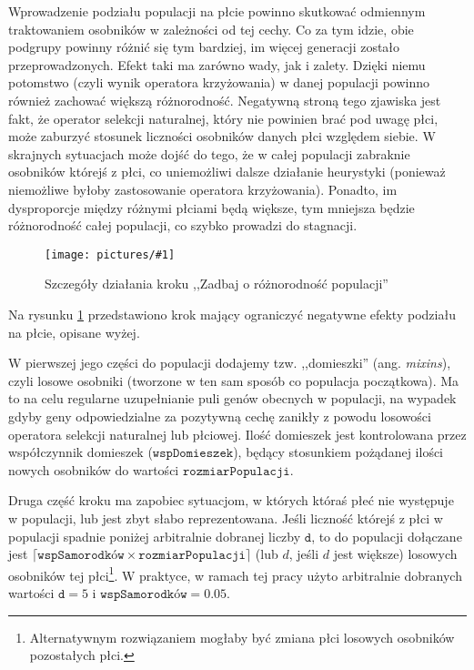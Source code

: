 \documentclass[twoside]{iisthesis}
\newcommand{\param}[1]{\mathtt{#1}}
\newcommand{\img}[1]{\texttt{[image: pictures/\#1]}}
\begin{document}
Wprowadzenie podziału populacji na płcie powinno skutkować odmiennym traktowaniem osobników w zależności od tej cechy. 
Co za tym idzie, obie podgrupy powinny różnić się tym bardziej, im więcej generacji zostało przeprowadzonych.
Efekt taki ma zarówno wady, jak i zalety. 
Dzięki niemu potomstwo (czyli wynik operatora krzyżowania) w danej populacji powinno również zachować większą różnorodność. 
Negatywną stroną tego zjawiska jest fakt, że operator selekcji naturalnej, który nie powinien brać pod uwagę płci, może zaburzyć stosunek liczności osobników danych płci względem siebie. 
W skrajnych sytuacjach może dojść do tego, że w całej populacji zabraknie osobników którejś z płci, co uniemożliwi dalsze działanie heurystyki (ponieważ niemożliwe byłoby zastosowanie operatora krzyżowania). 
Ponadto, im dysproporcje między różnymi płciami będą większe, tym mniejsza będzie różnorodność całej populacji, co szybko prowadzi do stagnacji.

\begin{figure}[H]
	\caption{Szczegóły działania kroku ,,Zadbaj o różnorodność populacji'' \label{figure:fixing}}
	\img{fixing.png}
\end{figure}

Na rysunku \ref{figure:fixing} przedstawiono krok mający ograniczyć negatywne efekty podziału na płcie, opisane wyżej. 

W pierwszej jego części do populacji dodajemy tzw. ,,domieszki'' (ang. \emph{mixins}), czyli losowe osobniki (tworzone w ten sam sposób co populacja początkowa). 
Ma to na celu regularne uzupełnianie puli genów obecnych w populacji, na wypadek gdyby geny odpowiedzialne za pozytywną cechę zanikły z powodu losowości operatora selekcji naturalnej lub płciowej. 
Ilość domieszek jest kontrolowana przez współczynnik domieszek ($\param{wspDomieszek}$), będący stosunkiem pożądanej ilości nowych osobników do wartości $\param{rozmiarPopulacji}$.

Druga część kroku ma zapobiec sytuacjom, w których któraś płeć nie występuje w populacji, lub jest zbyt słabo reprezentowana. 
Jeśli liczność którejś z płci w populacji spadnie poniżej arbitralnie dobranej liczby $\param{d}$, to do populacji dołączane jest $\lceil \param{wspSamorodków} \times \param{rozmiarPopulacji} \rceil$ (lub $d$, jeśli $d$ jest większe) losowych osobników tej płci\footnote{
	Alternatywnym rozwiązaniem mogłaby być zmiana płci losowych osobników pozostałych płci.
}. 
W praktyce, w ramach tej pracy użyto arbitralnie dobranych wartości $\param{d} = 5$ i $\param{wspSamorodków} = 0.05$.
\end{document}
